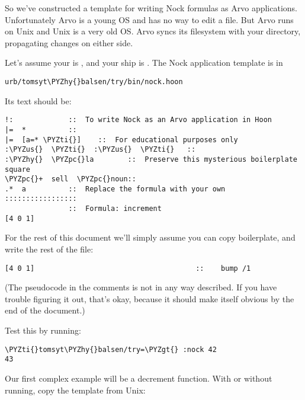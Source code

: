 So we've constructed a template for writing Nock formulas as Arvo
applications.  Unfortunately Arvo is a young OS and has no way to
edit a file.  But Arvo runs on Unix and Unix is a very old OS.
Arvo syncs its filesystem with your  directory,
propagating changes on either side.

Let's assume your  is , and your ship is
.  The Nock application template is in

\begin{framed_shaded}
\begin{Verbatim}[fontsize=\relsize{-2.5},commandchars=\\\{\}]
urb/tomsyt\PYZhy{}balsen/try/bin/nock.hoon
\end{Verbatim}
\end{framed_shaded}
Its text should be:

\begin{framed_shaded}
\begin{Verbatim}[fontsize=\relsize{-2.5},commandchars=\\\{\}]
!:             ::  To write Nock as an Arvo application in Hoon
|=  *          ::
|=  [a=* \PYZti{}]    ::  For educational purposes only
:\PYZus{}  \PYZti{}  :\PYZus{}  \PYZti{}   ::
:\PYZhy{}  \PYZpc{}la        ::  Preserve this mysterious boilerplate square
\PYZpc{}+  sell  \PYZpc{}noun::
.*  a          ::  Replace the formula with your own
:::::::::::::::::
               ::  Formula: increment
[4 0 1]
\end{Verbatim}
\end{framed_shaded}
For the rest of this document we'll simply assume you can copy
boilerplate, and write the rest of the file:

\begin{framed_shaded}
\begin{Verbatim}[fontsize=\relsize{-2.5},commandchars=\\\{\}]
[4 0 1]                                      ::    bump /1
\end{Verbatim}
\end{framed_shaded}
(The pseudocode in the comments is not in any way described.  If
you have trouble figuring it out, that's okay, because it should
make itself obvious by the end of the document.)

Test this by running:

\begin{framed_shaded}
\begin{Verbatim}[fontsize=\relsize{-2.5},commandchars=\\\{\}]
\PYZti{}tomsyt\PYZhy{}balsen/try=\PYZgt{} :nock 42
43
\end{Verbatim}
\end{framed_shaded}
Our first complex example will be a decrement function.  With or
without  running, copy the template from Unix:

